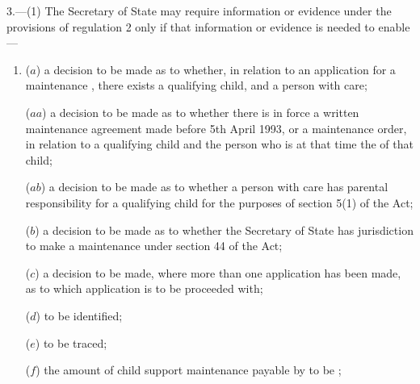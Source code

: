 \documentclass[a4paper,12pt]{article}
\begin{document}
3.—(1) The Secretary of State 
may require information or evidence under the provisions of regulation 2 only if that information or evidence is needed to enable—
\begin{enumerate}\item[]
($a$) a decision to be made as to whether, in relation to an application for a maintenance , there exists a qualifying child,  and a person with care;

($aa$) a decision to be made as to whether there is in force a written maintenance agreement made before 5th April 1993, or a maintenance order, %
in relation to a qualifying child and the person who is at that time the  of that child;

($ab$) a decision to be made as to whether a person with care has parental responsibility for a qualifying child for the purposes of section 5(1) of the Act;

($b$) a decision to be made as to whether 
the Secretary of State  %
has jurisdiction to make a maintenance  under section 44 of the Act;

($c$) a decision to be made, where more than one application has been made, as to which application is to be proceeded with;

($d$)  to be identified;

($e$)  to be traced;

($f$) the amount of child support maintenance payable by  to be ;  %


\end{enumerate}
\end{document}
